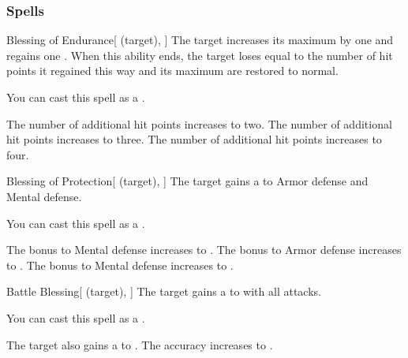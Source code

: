 \subsubsection{Spells}


\lowercase{\hypertarget{spell:Blessing of Endurance}{}}\label{spell:Blessing of Endurance}
\begin{attuneability}[Rank 1]{\hypertarget{spell:Blessing of Endurance}{Blessing of Endurance}}[ (target), ]
The target increases its maximum  by one and regains one .
When this ability ends, the target loses  equal to the number of hit points it regained this way and its maximum  are restored to normal.

You can cast this spell as a .

\rankline
{} The number of additional hit points increases to two.
 The number of additional hit points increases to three.
 The number of additional hit points increases to four.
\end{attuneability}
\vspace{0.25em}



\lowercase{\hypertarget{spell:Blessing of Protection}{}}\label{spell:Blessing of Protection}
\begin{attuneability}[Rank 1]{\hypertarget{spell:Blessing of Protection}{Blessing of Protection}}[ (target), ]
The target gains a   to Armor defense and Mental defense.

You can cast this spell as a .

\rankline
{} The bonus to Mental defense increases to .
 The bonus to Armor defense increases to .
 The bonus to Mental defense increases to .
\end{attuneability}
\vspace{0.25em}



\lowercase{\hypertarget{spell:Battle Blessing}{}}\label{spell:Battle Blessing}
\begin{attuneability}[Rank 3]{\hypertarget{spell:Battle Blessing}{Battle Blessing}}[ (target), ]
The target gains a   to  with all attacks.

You can cast this spell as a .

\rankline
{} The target also gains a   to .
 The accuracy increases to .
\end{attuneability}
\vspace{0.25em}



